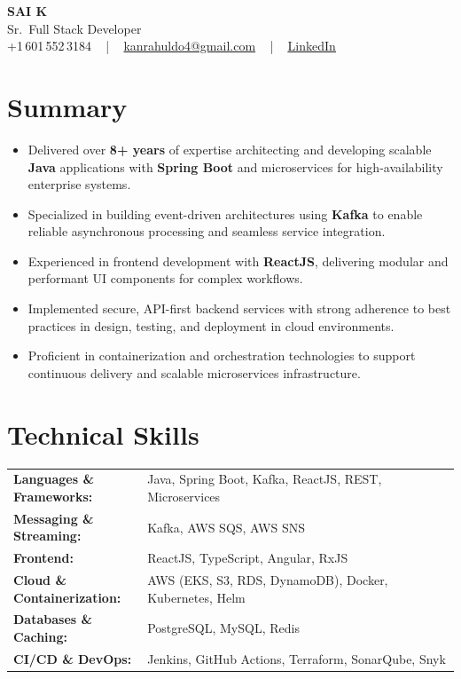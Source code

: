 \documentclass[letterpaper,11pt]{article}
\newcommand{\resumeItem}[1]{
  \item\footnotesize{
    {#1 \vspace{-2pt}}
  }
}
\newcommand{\resumeItemListStart}{\begin{itemize}[leftmargin=*]}
\newcommand{\resumeItemListEnd}{\end{itemize}\vspace{-5pt}}
\begin{document}
\begin{center}
    {\fontsize{14pt}{12pt}\selectfont \textbf{\MakeUppercase{Sai K}}}\\ \vspace{2pt}
    \fontsize{10pt}{12pt}\selectfont Sr.\ Full Stack Developer\\ \vspace{2pt}
    \fontsize{10pt}{12pt}\selectfont +1\,601\,552\,3184 ~ | ~
    \href{mailto:kanrahuldo4@gmail.com}{kanrahuldo4@gmail.com} ~ | ~
    \href{https://www.linkedin.com/in/srrrk/}{\color{blue}\underline{LinkedIn}}
    \vspace{-10pt}
\end{center}

\section{Summary}
\fontsize{9pt}{10pt}\selectfont
\resumeItemListStart
  \resumeItem{Delivered over \textbf{8+ years} of expertise architecting and developing scalable \textbf{Java} applications with \textbf{Spring Boot} and microservices for high-availability enterprise systems.}
  \resumeItem{Specialized in building event-driven architectures using \textbf{Kafka} to enable reliable asynchronous processing and seamless service integration.}
  \resumeItem{Experienced in frontend development with \textbf{ReactJS}, delivering modular and performant UI components for complex workflows.}
  \resumeItem{Implemented secure, API-first backend services with strong adherence to best practices in design, testing, and deployment in cloud environments.}
  \resumeItem{Proficient in containerization and orchestration technologies to support continuous delivery and scalable microservices infrastructure.}
\resumeItemListEnd
\vspace{-6pt}

\section{Technical Skills}
\vspace{-14pt}
\begin{table}[h]
\fontsize{9pt}{10pt}\selectfont
\begin{tabular}{p{0.3\linewidth} p{0.7\linewidth}}
\textbf{Languages \& Frameworks:} & Java, Spring Boot, Kafka, ReactJS, REST, Microservices \\
\textbf{Messaging \& Streaming:} & Kafka, AWS SQS, AWS SNS \\
\textbf{Frontend:} & ReactJS, TypeScript, Angular, RxJS \\
\textbf{Cloud \& Containerization:} & AWS (EKS, S3, RDS, DynamoDB), Docker, Kubernetes, Helm \\
\textbf{Databases \& Caching:} & PostgreSQL, MySQL, Redis \\
\textbf{CI/CD \& DevOps:} & Jenkins, GitHub Actions, Terraform, SonarQube, Snyk \\
\end{tabular}
\end{table}
\vspace{-15pt}
\end{document}
